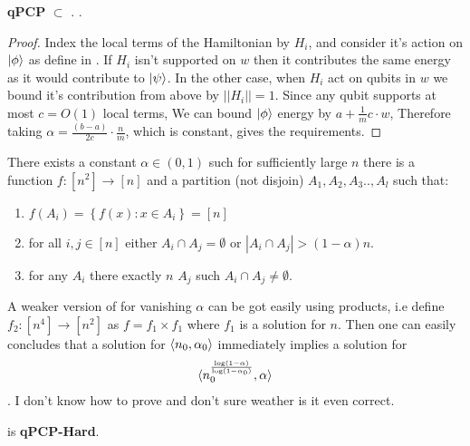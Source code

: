 \documentclass[manuscript,screen,review]{acmart}
\begin{document}
\begin{claim} \label{claim:inclass} \textbf{qPCP} $\subset $ \CLASS. .  
\end{claim}
\begin{proof}
  Index the local terms of the Hamiltonian by $H_{i}$, and consider it's action on $\ket{\phi}$ as define in . If $H_{i}$ isn't supported on $w$ then it contributes the same energy as it would contribute to $\ket{\psi}$. In the other case, when $H_{i}$ act on qubits in $w$ we bound it's contribution from above by $||H_{i}|| = 1$. Since any qubit supports at most $c= O(1)$ local terms, We can bound $\ket{\phi}$ energy by $a + \frac{1}{m}c\cdot w$, Therefore taking $\alpha  = \frac{(b-a)}{2c} \cdot \frac{n}{m}$, which is constant, gives the requirements.
\end{proof}


\begin{claim}
  \label{claim:conj} There exists a constant $\alpha \in (0,1)$ such for sufficiently large $n$ there is a function $f: \left[ n^{2} \right] \rightarrow \left[ n \right]$ and a partition (not disjoin) $A_{1}, A_{2}, A_{3} .., A_{l}$ such that:
  \begin{enumerate}
    \item $f(A_{i}) = \left\{ f(x) : x \in A_{i} \right\} = [n]$   
    \item for all $i,j \in [n]$ either $A_{i}\cap A_{j} = \emptyset$ or $|A_{i}\cap A_{j}| > (1-\alpha)n$.
    \item for any $A_i$ there exactly $n$ $A_j$ such $A_i \cap A_j \neq \emptyset$.
  \end{enumerate}
\end{claim}

\begin{remark}
  A weaker version of  for vanishing $\alpha$ can be got easily using products, i.e define $f_{2} : \left[ n^4 \right] \rightarrow \left[ n^{2} \right]$ as $f = f_{1}\times f_{1}$ where $f_{1}$ is a solution for $n$.
  Then one can easily concludes that a solution for $\braket{n_{0},\alpha_{0}}$ immediately implies a solution for\begin{equation*}
    \begin{split}
  \braket{n_{0}^{\frac{\log (1-\alpha)}{\log ( 1 - \alpha_{0})}}, \alpha}
    \end{split}
  \end{equation*}
  . I don't know how to prove  and don't sure weather is it even correct.
\end{remark}
\begin{claim}\label{claim:inqPCP}
  \CLASS is \textbf{qPCP-Hard}.
\end{claim}
\end{document}
